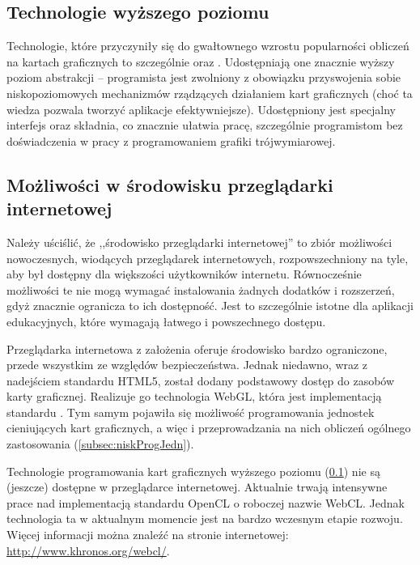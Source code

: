 \subsection{Technologie wyższego poziomu}
\label{subsec:techWyzPoz}

Technologie, które przyczyniły się do gwałtownego wzrostu popularności obliczeń
na kartach graficznych to szczególnie  oraz .
Udostępniają  one znacznie wyższy poziom abstrakcji -- programista jest
zwolniony z obowiązku przyswojenia sobie niskopoziomowych mechanizmów rządzących
działaniem kart graficznych (choć ta wiedza pozwala tworzyć aplikacje
efektywniejsze). Udostępniony jest specjalny interfejs oraz składnia, co
znacznie ułatwia pracę, szczególnie programistom bez doświadczenia w pracy z
programowaniem grafiki trójwymiarowej.

\subsection{Możliwości w środowisku przeglądarki internetowej}
\label{subsec:srodPrzegInt}

Należy uściślić, że ,,środowisko przeglądarki internetowej'' to zbiór możliwości
nowoczesnych, wiodących przeglądarek internetowych, rozpowszechniony na tyle,
aby był dostępny dla większości użytkowników internetu. Równocześnie możliwości
te nie mogą wymagać instalowania żadnych dodatków i rozszerzeń, gdyż znacznie
ogranicza to ich dostępność. Jest to szczególnie istotne dla aplikacji
edukacyjnych, które wymagają łatwego i powszechnego dostępu.

Przeglądarka internetowa z założenia oferuje środowisko bardzo ograniczone,
przede wszystkim ze względów bezpieczeństwa. Jednak niedawno, wraz z nadejściem
standardu HTML5, został dodany podstawowy dostęp do zasobów karty graficznej.
Realizuje go technologia WebGL, która jest implementacją standardu . Tym samym pojawiła się możliwość programowania jednostek cieniujących kart
graficznych, a więc i przeprowadzania na nich obliczeń ogólnego zastosowania
(\ref{subsec:niskProgJedn}).

Technologie programowania kart graficznych wyższego poziomu
(\ref{subsec:techWyzPoz}) nie są (jeszcze) dostępne w przeglądarce internetowej.
Aktualnie trwają intensywne prace nad implementacją standardu OpenCL o roboczej
nazwie WebCL. Jednak technologia ta w aktualnym momencie jest na bardzo wczesnym
etapie rozwoju. Więcej informacji można znaleźć na stronie internetowej:
\url{http://www.khronos.org/webcl/}.

